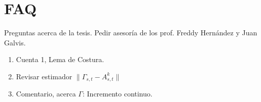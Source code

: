 
\section{FAQ}

Preguntas acerca de la tesis. Pedir asesoría de los prof. Freddy Hernández y Juan Galvis.

\begin{enumerate}
	
	\item Cuenta 1, Lema de Costura.
	\item Revisar estimador $\lVert \Gamma_{s,t} - A^k_{s,t} \rVert$
	\item Comentario, acerca $\Gamma$: Incremento continuo.

\end{enumerate}